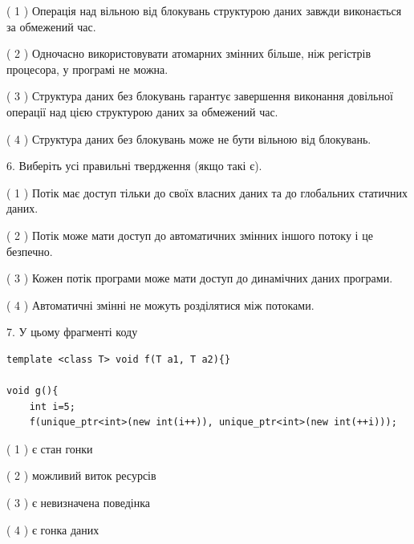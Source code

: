 \documentclass[12pt, ukrainian]{article}
\begin{document}
\begin {large}
{( 1 ) Операція над вільною від блокувань структурою даних завжди виконається за обмежений час.%

( 2 ) Одночасно використовувати атомарних змінних більше, ніж регістрів процесора, у програмі не можна.%

( 3 ) Структура даних без блокувань гарантує завершення виконання довільної операції над цією структурою даних за обмежений час.%

( 4 ) Структура даних без блокувань може не бути вільною від блокувань.%
\newpage



\vspace{5mm}
6. Виберіть усі правильні твердження (якщо такі є).\par
\vspace{2mm}

( 1 ) Потік має доступ тільки до своїх власних даних та до глобальних статичних даних.%

( 2 ) Потік може мати доступ до автоматичних змінних іншого потоку і це безпечно.%

( 3 ) Кожен потік програми може мати доступ до динамічних даних програми.%

( 4 ) Автоматичні змінні не можуть розділятися між потоками.%


\vspace{5mm}
7. У цьому фрагменті коду
\begin{verbatim}
template <class T> void f(T a1, T a2){}

void g(){
    int i=5;
    f(unique_ptr<int>(new int(i++)), unique_ptr<int>(new int(++i)));
\end{verbatim}

( 1 ) є стан гонки%

( 2 ) можливий виток ресурсів%

( 3 ) є невизначена поведінка%

( 4 ) є гонка даних%
}
\end {large}
\end{document}
